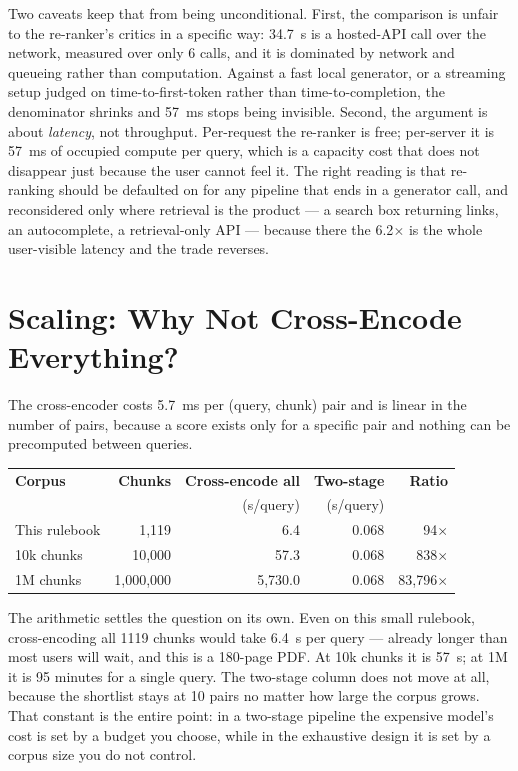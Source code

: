 \documentclass[11pt,a4paper]{article}
\begin{document}
Two caveats keep that from being unconditional. First, the comparison is
unfair to the re-ranker's critics in a specific way: 34.7~s is a hosted-API
call over the network, measured over only 6 calls, and it is dominated by
network and queueing rather than computation. Against a fast local generator,
or a streaming setup judged on time-to-first-token rather than
time-to-completion, the denominator shrinks and 57~ms stops being invisible.
Second, the argument is about \emph{latency}, not throughput. Per-request the
re-ranker is free; per-server it is 57~ms of occupied compute per query, which
is a capacity cost that does not disappear just because the user cannot feel
it. The right reading is that re-ranking should be defaulted on for any
pipeline that ends in a generator call, and reconsidered only where retrieval
is the product --- a search box returning links, an autocomplete, a
retrieval-only API --- because there the 6.2$\times$ is the whole user-visible
latency and the trade reverses.

\section{Scaling: Why Not Cross-Encode Everything?}

The cross-encoder costs 5.7~ms per (query, chunk) pair and is linear in the
number of pairs, because a score exists only for a specific pair and nothing
can be precomputed between queries.

\begin{center}\begin{tabular}{lrrrr}\toprule
\textbf{Corpus} & \textbf{Chunks} & \textbf{Cross-encode all} & \textbf{Two-stage} & \textbf{Ratio} \\
 & & (s/query) & (s/query) & \\ \midrule
This rulebook & 1,119 & 6.4 & 0.068 & 94$\times$ \\
10k chunks & 10,000 & 57.3 & 0.068 & 838$\times$ \\
1M chunks & 1,000,000 & 5,730.0 & 0.068 & 83,796$\times$ \\
\bottomrule\end{tabular}\end{center}
The arithmetic settles the question on its own. Even on this small rulebook,
cross-encoding all 1119 chunks would take 6.4~s per query --- already longer
than most users will wait, and this is a 180-page PDF. At 10k chunks it is
57~s; at 1M it is 95 minutes for a single query. The two-stage column does not
move at all, because the shortlist stays at 10 pairs no matter how large the
corpus grows. That constant is the entire point: in a two-stage pipeline the
expensive model's cost is set by a budget you choose, while in the exhaustive
design it is set by a corpus size you do not control.
\end{document}
